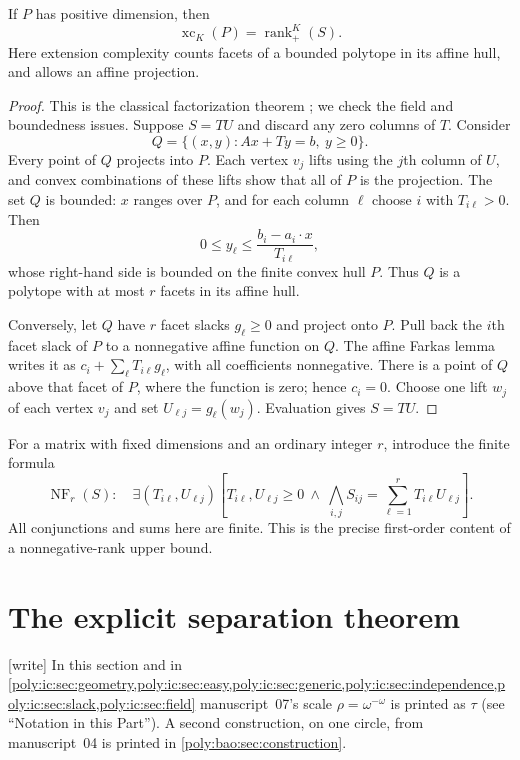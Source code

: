 \documentclass[11pt,a4paper]{article}
\numberwithin{equation}{section}
\theoremstyle{plain}
\newcommand{\wtag}{\textup{[write]}}%
\newcommand{\xc}{\operatorname{xc}}
\newcommand{\nrk}{\operatorname{rank}_{+}}
\newcommand{\NF}{\operatorname{NF}}
\begin{document}
\begin{proposition}\label{poly:bao:prop:yann}
If $P$ has positive dimension, then
\[
 \xc_K(P)=\nrk^K(S).
\]
Here extension complexity counts facets of a bounded polytope in its
affine hull, and allows an affine projection.
\end{proposition}
\begin{proof}
This is the classical factorization theorem \cite{ic:yannakakis}; we check the
field and boundedness issues. Suppose $S=TU$ and discard any zero columns
of $T$. Consider
\[
 Q=\{(x,y):Ax+Ty=b,\ y\geq0\}.
\]
Every point of $Q$ projects into $P$. Each vertex $v_j$ lifts using the
$j$th column of $U$, and convex combinations of these lifts show that all
of $P$ is the projection. The set $Q$ is bounded: $x$ ranges over $P$, and
for each column $\ell$ choose $i$ with $T_{i\ell}>0$. Then
\[
 0\leq y_\ell\leq\frac{b_i-a_i\cdot x}{T_{i\ell}},
\]
whose right-hand side is bounded on the finite convex hull $P$. Thus $Q$
is a polytope with at most $r$ facets in its affine hull.

Conversely, let $Q$ have $r$ facet slacks $g_\ell\geq0$ and project onto
$P$. Pull back the $i$th facet slack of $P$ to a nonnegative affine function
on $Q$. The affine Farkas lemma writes it as
$c_i+\sum_\ell T_{i\ell}g_\ell$, with all coefficients nonnegative.
There is a point of $Q$ above that facet of $P$, where the function is
zero; hence $c_i=0$. Choose one lift $w_j$ of each vertex $v_j$ and set
$U_{\ell j}=g_\ell(w_j)$. Evaluation gives $S=TU$.
\end{proof}

For a matrix with fixed dimensions and an ordinary integer $r$, introduce
the finite formula
\begin{equation}\label{poly:bao:eq:NF}
 \NF_r(S):\quad
 \exists(T_{i\ell},U_{\ell j})\left[
 T_{i\ell},U_{\ell j}\geq0\ \wedge\
 \bigwedge_{i,j} S_{ij}=\sum_{\ell=1}^rT_{i\ell}U_{\ell j}
 \right].
\end{equation}
All conjunctions and sums here are finite. This is the precise
first-order content of a nonnegative-rank upper bound.

\section{The explicit separation theorem}\label{poly:ic:sec:main}

\wtag{} In this section and in
\cref{poly:ic:sec:geometry,poly:ic:sec:easy,poly:ic:sec:generic,poly:ic:sec:independence,poly:ic:sec:slack,poly:ic:sec:field}
manuscript~07's scale $\rho=\omega^{-\omega}$ is printed as $\tau$ (see
``Notation in this Part''). A second construction, on one circle, from
manuscript~04 is printed in \cref{poly:bao:sec:construction}.
\end{document}
